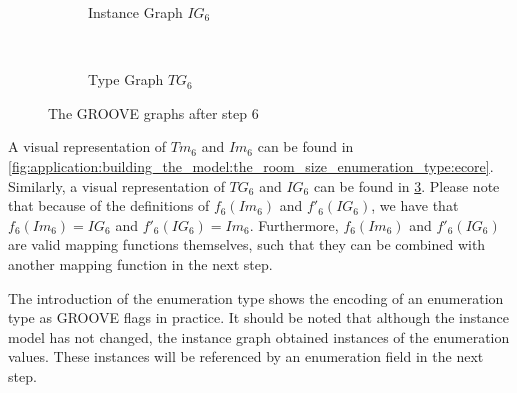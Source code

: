 \begin{figure}[p]
    \centering
    \begin{subfigure}{0.98\textwidth}
        \centering
        
        \caption{Instance Graph $IG_6$}
        \label{fig:application:building_the_model:the_room_size_enumeration_type:groove:instance_graph}
    \end{subfigure}
    \\
    \begin{subfigure}{0.98\textwidth}
        \centering
        
        \caption{Type Graph $TG_6$}
        \label{fig:application:building_the_model:the_room_size_enumeration_type:groove:type_graph}
    \end{subfigure}
    \caption{The GROOVE graphs after step 6}
    \label{fig:application:building_the_model:the_room_size_enumeration_type:groove}
\end{figure}

A visual representation of $Tm_6$ and $Im_6$ can be found in \cref{fig:application:building_the_model:the_room_size_enumeration_type:ecore}. Similarly, a visual representation of $TG_6$ and $IG_6$ can be found in \cref{fig:application:building_the_model:the_room_size_enumeration_type:groove}. Please note that because of the definitions of $f_6(Im_6)$ and $f'_6(IG_6)$, we have that $f_6(Im_6) = IG_6$ and $f'_6(IG_6) = Im_6$. Furthermore, $f_6(Im_6)$ and $f'_6(IG_6)$ are valid mapping functions themselves, such that they can be combined with another mapping function in the next step.

The introduction of the enumeration type shows the encoding of an enumeration type as GROOVE flags in practice. It should be noted that although the instance model has not changed, the instance graph obtained instances of the enumeration values. These instances will be referenced by an enumeration field in the next step.

\afterpage{\FloatBarrier}
